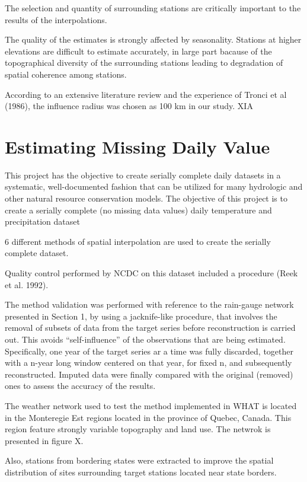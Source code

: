 \documentclass[WHATMANUAL.tex]{subfiles}
\begin{document}
The selection and quantity of surrounding stations are critically important to the results of the interpolations.

The quality of the estimates is strongly affected by seasonality. Stations at higher elevations are difficult to estimate accurately, in large part bacause of the topographical diversity of the surrounding stations leading to degradation of spatial coherence among stations.

According to an extensive literature review and the experience of Tronci et al (1986), the influence radius was chosen as 100 km in our study. XIA

\section{Estimating Missing Daily Value}

This project \citep{eischeid_creating_2000} has the objective to create serially complete daily datasets in a systematic, well-documented fashion that can be utilized for many hydrologic and other natural resource conservation models. The objective of this project is to create a serially complete (no missing data values) daily temperature and precipitation dataset

6 different methods of spatial interpolation are used to create the serially complete dataset.

Quality control performed by NCDC on this dataset included a procedure (Reek et al. 1992).

The method validation was performed with reference to the rain-gauge network presented in Section 1, by using a jacknife-like procedure, that involves the removal of subsets of data from the target series before reconstruction is carried out. This avoids ``self-influence'' of the observations that are being estimated. Specifically, one year of the target series ar a time was fully discarded, together with a n-year long window centered on that year, for fixed n, and subsequently reconstructed. Imputed data were finally compared with the original (removed) ones to assess the accuracy of the results.

The weather network used to test the method implemented in WHAT is located in the Monteregie Est regions located in the province of Quebec, Canada. This region feature strongly variable topography and land use. The netwrok is presented in figure X.

Also, stations from bordering states were extracted to improve the spatial distribution of sites surrounding target stations located near state borders.
\end{document}
